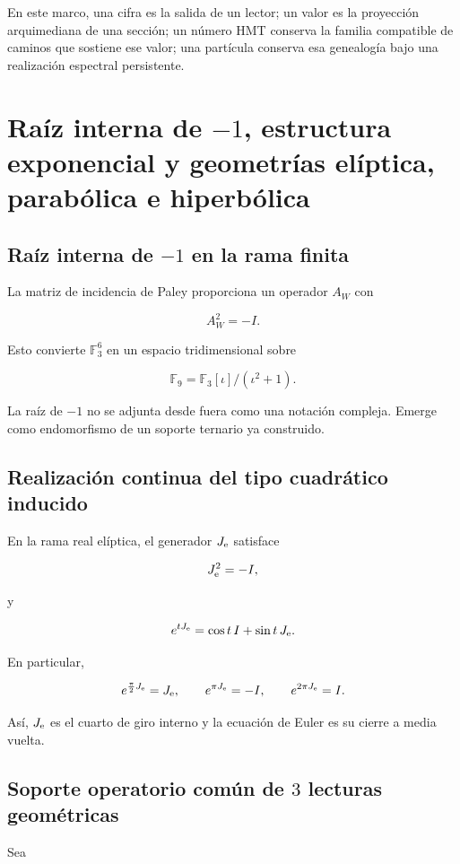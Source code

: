 En este marco, una cifra es la salida de un lector; un valor es la proyección arquimediana de una sección; un número HMT conserva la familia compatible de caminos que sostiene ese valor; una partícula conserva esa genealogía bajo una realización espectral persistente.


\section{Raíz interna de \(-1\), estructura exponencial y geometrías elíptica, parabólica e hiperbólica}

\subsection{Raíz interna de \(-1\) en la rama finita}

La matriz de incidencia de Paley proporciona un operador \(A_W\) con

\[
A_W^2=-I.
\]

Esto convierte \(\mathbb F_3^6\) en un espacio tridimensional sobre

\[
\mathbb F_9=\mathbb F_3[\iota]/(\iota^2+1).
\]

La raíz de \(-1\) no se adjunta desde fuera como una notación compleja. Emerge como endomorfismo de un soporte ternario ya construido.

\subsection{Realización continua del tipo cuadrático inducido}

En la rama real elíptica, el generador \(J_{\rm e}\) satisface

\[
J_{\rm e}^2=-I,
\]

y

\[
e^{tJ_{\rm e}}=\cos t\,I+\sin t\,J_{\rm e}.
\]

En particular,

\[
e^{\frac\pi2J_{\rm e}}=J_{\rm e},\qquad
e^{\pi J_{\rm e}}=-I,\qquad
e^{2\pi J_{\rm e}}=I.
\]

Así, \(J_{\rm e}\) es el cuarto de giro interno y la ecuación de Euler es su cierre a media vuelta.

\subsection{Soporte operatorio común de \(3\) lecturas geométricas}

Sea

